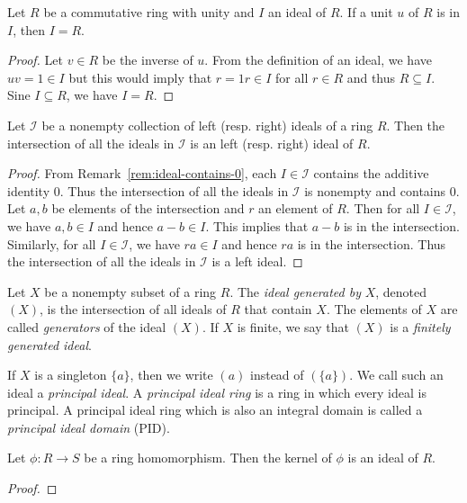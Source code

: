 \begin{theorem}
    Let \(R\) be a commutative ring with unity and \(I\) an ideal of \(R\). If a
    unit \(u\) of \(R\) is in \(I\), then \(I = R\).
\end{theorem}

\begin{proof}
    Let \(v \in R\) be the inverse of \(u\). From the definition of an ideal, we
    have \(uv = 1 \in I\) but this would imply that \(r = 1r \in I\) for all \(r
    \in R\) and thus \(R \subseteq I\). Sine \(I \subseteq R\), we have \(I =
    R\).
\end{proof}

\begin{theorem}
    Let \(\mathcal{I}\) be a nonempty collection of left (resp. right) ideals of
    a ring \(R\). Then the intersection of all the ideals in \(\mathcal{I}\) is
    an left (resp. right) ideal of \(R\).
\end{theorem}

\begin{proof}
    From Remark~\ref{rem:ideal-contains-0}, each \(I \in \mathcal{I}\) contains
    the additive identity \(0\). Thus the intersection of all the ideals in
    \(\mathcal{I}\) is nonempty and contains \(0\). Let \(a, b\) be elements of
    the intersection and \(r\) an element of \(R\). Then for all \(I \in
    \mathcal{I}\), we have \(a, b \in I\) and hence \(a - b \in I\). This
    implies that \(a - b\) is in the intersection. Similarly, for all \(I \in
    \mathcal{I}\), we have \(ra \in I\) and hence \(ra\) is in the intersection.
    Thus the intersection of all the ideals in \(\mathcal{I}\) is a left ideal.
\end{proof}

\begin{definition}
    Let \(X\) be a nonempty subset of a ring \(R\). The \emph{ideal generated
    by} \(X\), denoted \((X)\), is the intersection of all ideals of \(R\) that
    contain \(X\). The elements of \(X\) are called \emph{generators} of the
    ideal \((X)\). If \(X\) is finite, we say that \((X)\) is a \emph{finitely
    generated ideal}.

    If \(X\) is a singleton \(\{a\}\), then we write \((a)\) instead of
    \((\{a\})\). We call such an ideal a \emph{principal ideal}. A
    \emph{principal ideal ring} is a ring in which every ideal is principal. A
    principal ideal ring which is also an integral domain is called a
    \emph{principal ideal domain} (PID).
\end{definition}

\begin{theorem}
    Let \(\phi: R \to S\) be a ring homomorphism. Then the kernel of \(\phi\) is
    an ideal of \(R\).
\end{theorem}

\begin{proof}
    
\end{proof}